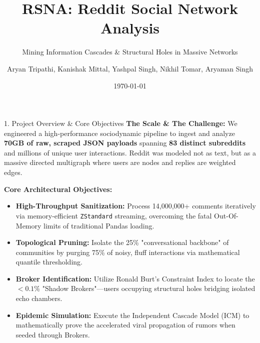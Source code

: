 \documentclass[aspectratio=169, 10pt]{beamer}
\title{RSNA: Reddit Social Network Analysis}
\subtitle{Mining Information Cascades \& Structural Holes in Massive Networks}
\date{\today}
\author{Aryan Tripathi, Kanishak Mittal, Yashpal Singh, Nikhil Tomar, Aryaman Singh}
\institute{Data Mining and Data Warehousing, IIIT Raichur}
\begin{document}
\begin{frame}[plain]
    \titlepage
\end{frame}

\begin{frame}{1. Project Overview \& Core Objectives}
    \textbf{The Scale \& The Challenge:} We engineered a high-performance sociodynamic pipeline to ingest and analyze \textbf{70GB of raw, scraped JSON payloads} spanning \textbf{83 distinct subreddits} and millions of unique user interactions. Reddit was modeled not as text, but as a massive directed multigraph where users are nodes and replies are weighted edges.
    
    \vspace{0.3cm}
    \textbf{Core Architectural Objectives:}
    \begin{itemize}
        \item \textbf{High-Throughput Sanitization:} Process 14,000,000+ comments iteratively via memory-efficient \texttt{ZStandard} streaming, overcoming the fatal Out-Of-Memory limits of traditional Pandas loading.
        \item \textbf{Topological Pruning:} Isolate the 25\% "conversational backbone" of communities by purging 75\% of noisy, fluff interactions via mathematical quantile thresholding.
        \item \textbf{Broker Identification:} Utilize Ronald Burt's Constraint Index to locate the $<0.1\%$ "Shadow Brokers"—users occupying structural holes bridging isolated echo chambers.
        \item \textbf{Epidemic Simulation:} Execute the Independent Cascade Model (ICM) to mathematically prove the accelerated viral propagation of rumors when seeded through Brokers.
    \end{itemize}
\end{frame}
\end{document}
